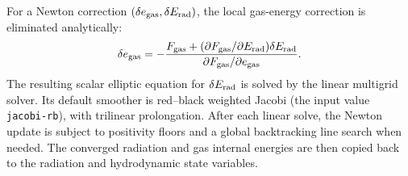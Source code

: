 For a Newton correction $(\delta e_{\rm gas},\delta E_{\rm rad})$, the local
gas-energy correction is eliminated analytically:
\begin{align}
    \delta e_{\rm gas}
    =-\frac{F_{\rm gas}
       +(\partial F_{\rm gas}/\partial E_{\rm rad})\delta E_{\rm rad}}
      {\partial F_{\rm gas}/\partial e_{\rm gas}}.
    \label{eq:local_gas_elimination}
\end{align}
The resulting scalar elliptic equation for $\delta E_{\rm rad}$ is solved by
the linear multigrid solver.  Its default smoother is red--black weighted
Jacobi (the input value \texttt{jacobi-rb}), with trilinear prolongation.
After each linear solve, the Newton update is subject to positivity floors and
a global backtracking line search when needed.  The converged radiation and
gas internal energies are then copied back to the radiation and hydrodynamic
state variables.
